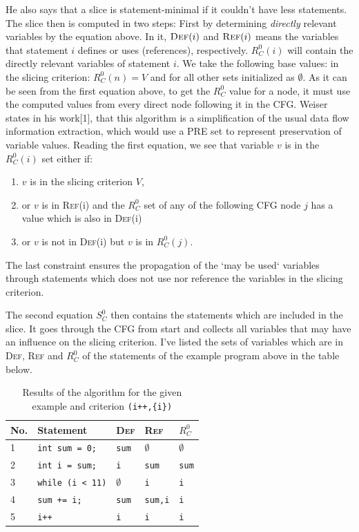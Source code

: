 \documentclass[oneside,12pt,a4paper]{book}
\begin{document}
He also says that a slice is statement-minimal if it couldn't have less statements. The slice then is computed in two steps:
First by determining \textit{directly} relevant variables by the equation above. In it, $\textsc{Def}(i)$ and $\textsc{Ref}(i)$ means the variables that statement $i$ defines or uses (references), respectively. $R^0_C(i)$ will contain the directly relevant variables of statement $i$. We take the following base values: in the slicing criterion: $R^0_C(n) = V$ and for all other sets initialized as $\emptyset$. As it can be seen from the first equation above, to get the $R^0_C$ value for a node, it must use the computed values from every direct node following it in the CFG. Weiser states in his work[1], that this algorithm is a simplification of the usual data flow information extraction, which would use a PRE set to represent preservation of variable values. Reading the first equation, we see that variable $v$ is in the $R^0_C(i)$ set either if:
\begin{enumerate}
\item $v$ is in the slicing criterion $V$,
\item or $v$ is in \textsc{Ref}(i) and the $R^0_C$ set of any of the following CFG node $j$ has a value which is also in \textsc{Def}(i) 
\item or $v$ is not in \textsc{Def}(i) but $v$ is in $R^0_C(j)$.
\end{enumerate}
The last constraint ensures the propagation of the `may be used` variables through statements which does not use nor reference the variables in the slicing criterion. 

The second equation $S^0_C$ then contains the statements which are included in the slice. It goes through the CFG from start and collects all variables that may have an influence on the slicing criterion. I've listed the sets of variables which are in \textsc{Def}, \textsc{Ref} and $R^0_C$ of the statements of the example program above in the table below.

\begin{table}[h]
  \centering
  	\begin{tabular}{|l|l|l|l|l|}
\hline
No. & Statement                & \textsc{Def} & \textsc{Ref}   & $R^0_C$      \\ \hline
1   & \texttt{int sum = 0;}    & \texttt{sum} & $\emptyset$    & $\emptyset$  \\ \hline
2   & \texttt{int i = sum;}    & \texttt{i}   & \texttt{sum}   & \texttt{sum} \\ \hline
3   & \texttt{while (i < 11)}  & $\emptyset$  & \texttt{i}     & \texttt{i}   \\ \hline
4   & \texttt{sum += i;}       & \texttt{sum} & \texttt{sum,i} & \texttt{i}   \\ \hline
5   & \texttt{i++}             & \texttt{i}   & \texttt{i}     & \texttt{i}   \\ \hline
  \end{tabular}
  \caption{Results of the algorithm for the given example and criterion \texttt{(i++,\{i\})} }
  \label{tab:weiserExampleTable}
\end{table}
\end{document}
